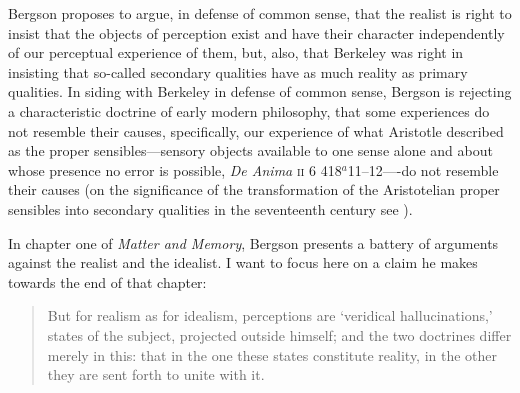 \documentclass[12pt]{article}
\begin{document}
Bergson proposes to argue, in defense of common sense, that the realist is right to insist that the objects of perception exist and have their character independently of our perceptual experience of them, but, also, that Berkeley was right in insisting that so-called secondary qualities have as much reality as primary qualities. In siding with Berkeley in defense of common sense, Bergson is rejecting a characteristic doctrine of early modern philosophy, that some experiences do not resemble their causes, specifically, our experience of what Aristotle described as the proper sensibles---sensory objects available to one sense alone and about whose presence no error is possible, \emph{De Anima} \textsc{ii} 6 418\( ^{a} \)11–12----do not resemble their causes (on the significance of the transformation of the Aristotelian proper sensibles into secondary qualities in the seventeenth century see \citealt{Smith:1990sm,Winkler:2011aa}).

In chapter one of \emph{Matter and Memory}, Bergson presents a battery of arguments against the realist and the idealist. I want to focus here on a claim he makes towards the end of that chapter:
\begin{quote}
	But for realism as for idealism, perceptions are `veridical hallucinations,' states of the subject, projected outside himself; and the two doctrines differ merely in this: that in the one these states constitute reality, in the other they are sent forth to unite with it. \citep[73]{Bergson:1912pi}
\end{quote}
\end{document}
